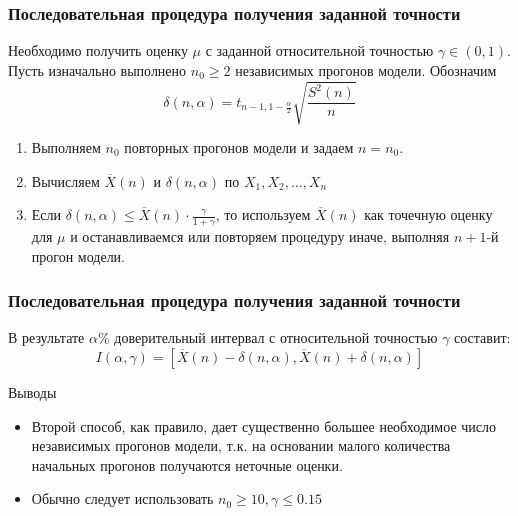 \documentclass[utf8]{beamer}
\begin{document}
\begin{frame}
\frametitle{Последовательная процедура получения заданной точности}
Необходимо получить оценку $\mu$ с заданной относительной точностью
$\gamma \in (0, 1)$. Пусть изначально выполнено $n_0\geq2$ независимых
прогонов модели. Обозначим
$$
\delta (n, \alpha) = t_{n-1, 1-\frac{\alpha}{2}}\sqrt{\frac{S^2(n)}{n}}
$$
\begin{enumerate}
  \item Выполняем $n_0$ повторных прогонов модели и задаем $n = n_0$.
  \item Вычисляем $\overline{X}(n)$ и $\delta (n, \alpha)$ по $X_1, X_2, \ldots, X_n$
  \item Если $\delta (n, \alpha)\leq \overline{X}(n) \cdot \frac{\gamma}{1+\gamma}$, то используем $\overline{X}(n)$ как точечную оценку для $\mu$ и останавливаемся или повторяем процедуру иначе, выполняя $n+1$-й прогон модели.
\end{enumerate}
\end{frame}
\begin{frame}
\frametitle{Последовательная процедура получения заданной точности}
В результате $\alpha$\% доверительный интервал с относительной
точностью $\gamma$ составит:
$$
I(\alpha, \gamma) = [\overline{X}(n)-\delta (n, \alpha), \overline{X}(n)+\delta (n, \alpha)]
$$
\begin{block}{Выводы}
\begin{itemize}
  \item Второй способ, как правило, дает существенно большее необходимое число независимых прогонов модели, т.к. на основании малого количества начальных прогонов получаются неточные оценки.
  \item Обычно следует использовать $n_0 \geq 10, \gamma \leq 0.15$
\end{itemize}
\end{block}
\end{frame}
\end{document}
